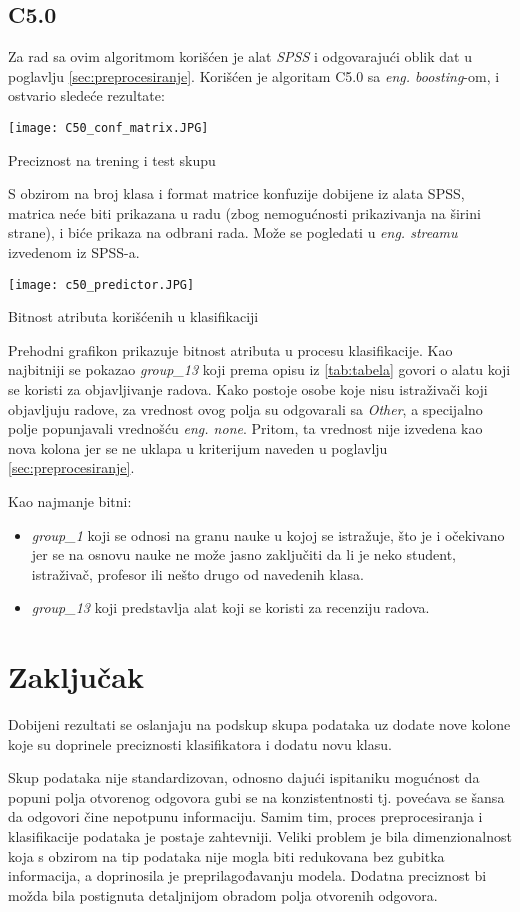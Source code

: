 \documentclass[12pt]{article}
\begin{document}
\subsection{C5.0}

Za rad sa ovim algoritmom korišćen je alat \textit{SPSS} i odgovarajući oblik dat u poglavlju \ref{sec:preprocesiranje}.
Korišćen je algoritam C5.0 sa \textit{eng. boosting}-om, i ostvario sledeće rezultate:

\begin{center}
\texttt{[image: C50\_conf\_matrix.JPG]}
\caption{Preciznost na trening i test skupu}
\label{fig:figure3}
\end{center}

S obzirom na broj klasa i format matrice konfuzije dobijene iz alata SPSS, matrica neće biti prikazana u radu (zbog nemogućnosti prikazivanja na širini strane), i biće prikaza na odbrani rada.
Može se pogledati u \textit{eng. streamu} izvedenom iz SPSS-a.

\begin{center}
\texttt{[image: c50\_predictor.JPG]}
\caption{Bitnost atributa korišćenih u klasifikaciji}
\label{fig:figure5}
\end{center}

Prehodni grafikon prikazuje bitnost atributa u procesu klasifikacije. Kao najbitniji se pokazao \textit{group\_13} koji prema opisu iz \ref{tab:tabela} govori o alatu koji se koristi za objavljivanje radova. Kako postoje osobe koje nisu istraživači koji objavljuju radove, za vrednost ovog polja su odgovarali sa \textit{Other}, a specijalno polje popunjavali vrednošću \textit{eng. none}. Pritom, ta vrednost nije izvedena kao nova kolona jer se ne uklapa u kriterijum naveden u poglavlju \ref{sec:preprocesiranje}.

Kao najmanje bitni:
\begin{itemize}
  \item \textit{group\_1} koji se odnosi na granu nauke u kojoj se istražuje, što je i očekivano jer se na osnovu nauke ne može jasno zaključiti da li je neko student, istraživač, profesor ili nešto drugo od navedenih klasa.
  \item \textit{group\_13} koji predstavlja alat koji se koristi za recenziju radova.
\end{itemize}
\newpage
\section{Zaključak}
\label{sec:zakljucak}

Dobijeni rezultati se oslanjaju na podskup skupa podataka uz dodate nove kolone koje su doprinele preciznosti klasifikatora i dodatu novu klasu. 

Skup podataka nije standardizovan, odnosno dajući ispitaniku mogućnost da popuni polja otvorenog odgovora gubi se na konzistentnosti tj. povećava se šansa da odgovori čine nepotpunu informaciju. Samim tim, proces preprocesiranja i klasifikacije podataka je postaje zahtevniji. Veliki problem je bila dimenzionalnost koja s obzirom na tip podataka nije mogla biti redukovana bez gubitka informacija, a doprinosila je preprilagođavanju modela. Dodatna preciznost bi možda bila postignuta detaljnijom obradom polja otvorenih odgovora.
\end{document}
